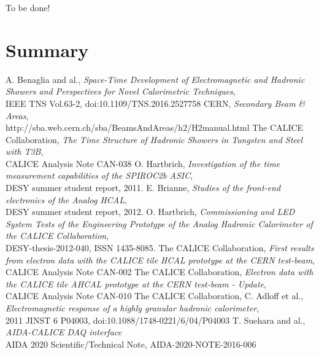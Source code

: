 \documentclass[twoside,a4paper,11pt]{article}
\begin{document}
To be done!

\section{Summary}

\clearpage

\begin{thebibliography}{10}
	A. Benaglia and al., \textit{Space-Time Development of Electromagnetic and Hadronic Showers and Perspectives for Novel Calorimetric Techniques}, \\
	IEEE TNS Vol.63-2, doi:10.1109/TNS.2016.2527758
	CERN, \textit{Secondary Beam \& Areas}, \\
	http://sba.web.cern.ch/sba/BeamsAndAreas/h2/H2manual.html
	The CALICE Collaboration, \textit{The Time Structure of Hadronic Showers in Tungsten and Steel with T3B}, \\
	CALICE Analysis Note CAN-038
	 O. Hartbrich, \textit{Investigation of the time measurement capabilities of the SPIROC2b ASIC}, \\
	 DESY summer student report, 2011.
	 E. Brianne, \textit{Studies of the front-end electronics of the Analog HCAL}, \\
	 DESY summer student report, 2012.
	 O. Hartbrich, \textit{Commissioning and LED System Tests of the Engineering Prototype of the Analog Hadronic Calorimeter of the CALICE Collaboration}, \\
	 DESY-thesis-2012-040, ISSN 1435-8085.
	 The CALICE Collaboration, \textit{First results from electron data with the CALICE tile HCAL prototype at the CERN test-beam}, \\
	 CALICE Analysis Note CAN-002
	 The CALICE Collaboration, \textit{Electron data with the CALICE tile AHCAL prototype at the CERN test-beam - Update}, \\
	 CALICE Analysis Note CAN-010
	 The CALICE Collaboration, C. Adloff et al., \textit{Electromagnetic response of a highly granular hadronic calorimeter}, \\
	 2011 JINST 6 P04003, doi:10.1088/1748-0221/6/04/P04003
	 T. Suehara and al., \textit{AIDA-CALICE DAQ interface} \\
	 AIDA 2020 Scientific/Technical Note, AIDA-2020-NOTE-2016-006
\end{thebibliography}
\end{document}

